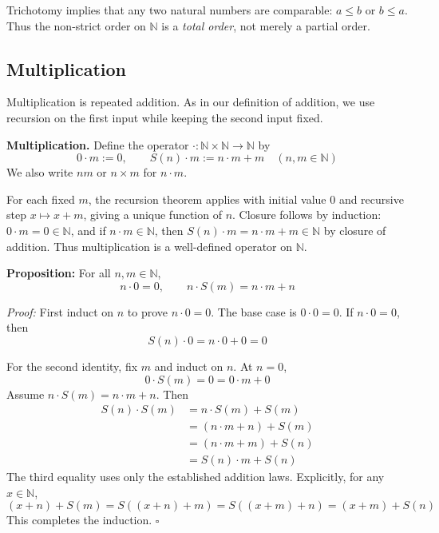 \documentclass[a4paper,11pt,abstracton]{scrartcl}
\newcommand{\NN}{\mathbb{N}}
\theoremstyle{dotlessP}
\theoremstyle{dotlessS}
\theoremstyle{remark}
\theoremstyle{definition}
\begin{document}
Trichotomy implies that any two natural numbers are comparable:
$a\le b$ or $b\le a$. Thus the non-strict order on $\NN$ is a
\emph{total order}, not merely a partial order.

\subsection{Multiplication}
\label{subsec:multiplication}

Multiplication is repeated addition. As in our definition of addition, we
use recursion on the first input while keeping the second input fixed.

\begin{definition_box}
\textbf{Multiplication.} Define the operator
$\cdot:\NN\times\NN\to\NN$ by
\[
    0\cdot m:=0,
    \qquad S(n)\cdot m:=n\cdot m+m
    \quad(n,m\in\NN)
\]
We also write $nm$ or $n\times m$ for $n\cdot m$.
\end{definition_box}

For each fixed $m$, the recursion theorem applies with initial value $0$
and recursive step $x\mapsto x+m$, giving a unique function of $n$.
Closure follows by induction: $0\cdot m=0\in\NN$, and if
$n\cdot m\in\NN$, then $S(n)\cdot m=n\cdot m+m\in\NN$ by closure
of addition. Thus multiplication is a well-defined operator on $\NN$.

\begin{problem_box}
\textbf{Proposition:}
For all $n,m\in\NN$,
\[
    n\cdot0=0,
    \qquad n\cdot S(m)=n\cdot m+n
\]
\end{problem_box}

\begin{claim_box}
\textit{Proof:}
First induct on $n$ to prove $n\cdot0=0$. The base case is
$0\cdot0=0$. If $n\cdot0=0$, then
\[
    S(n)\cdot0=n\cdot0+0=0
\]

For the second identity, fix $m$ and induct on $n$. At $n=0$,
\[
    0\cdot S(m)=0=0\cdot m+0
\]
Assume $n\cdot S(m)=n\cdot m+n$. Then
\[
\begin{aligned}
    S(n)\cdot S(m)
    &=n\cdot S(m)+S(m)\\
    &=(n\cdot m+n)+S(m)\\
    &=(n\cdot m+m)+S(n)\\
    &=S(n)\cdot m+S(n)
\end{aligned}
\]
The third equality uses only the established addition laws. Explicitly,
for any $x\in\NN$,
\[
    (x+n)+S(m)=S((x+n)+m)=S((x+m)+n)=(x+m)+S(n)
\]
This completes the induction.
\hfill$\square$
\end{claim_box}
\end{document}
